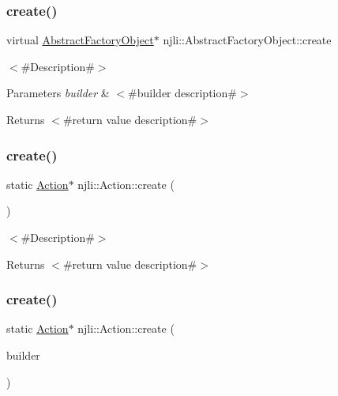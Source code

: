 \subsubsection{\texorpdfstring{create()}{create()}\hspace{0.1cm}{\footnotesize\ttfamily [1/3]}}
{\footnotesize\ttfamily virtual \mbox{\hyperlink{classnjli_1_1_abstract_factory_object}{Abstract\+Factory\+Object}}$\ast$ njli\+::\+Abstract\+Factory\+Object\+::create}

$<$\#\+Description\#$>$


\begin{DoxyParams}{Parameters}
{\em builder} & $<$\#builder description\#$>$\\
\hline
\end{DoxyParams}
\begin{DoxyReturn}{Returns}
$<$\#return value description\#$>$ 
\end{DoxyReturn}
\mbox{\label{classnjli_1_1_action_a62fc29bc5c18f70547b0769eef7c7dba}} 
\subsubsection{\texorpdfstring{create()}{create()}\hspace{0.1cm}{\footnotesize\ttfamily [2/3]}}
{\footnotesize\ttfamily static \mbox{\hyperlink{classnjli_1_1_action}{Action}}$\ast$ njli\+::\+Action\+::create (\begin{DoxyParamCaption}{ }\end{DoxyParamCaption})\hspace{0.3cm}{\ttfamily [static]}}

$<$\#\+Description\#$>$

\begin{DoxyReturn}{Returns}
$<$\#return value description\#$>$ 
\end{DoxyReturn}
\mbox{\label{classnjli_1_1_action_a1bce37d99fd72302c469c60ec97cfbcf}} 
\subsubsection{\texorpdfstring{create()}{create()}\hspace{0.1cm}{\footnotesize\ttfamily [3/3]}}
{\footnotesize\ttfamily static \mbox{\hyperlink{classnjli_1_1_action}{Action}}$\ast$ njli\+::\+Action\+::create (\begin{DoxyParamCaption}\item[{const \mbox{\hyperlink{classnjli_1_1_action_builder}{Action\+Builder}} \&}]{builder }\end{DoxyParamCaption})\hspace{0.3cm}{\ttfamily [static]}}

